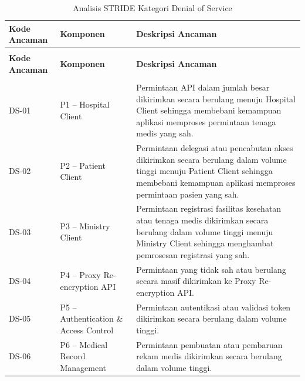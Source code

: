 \begin{xltabular}{\textwidth}{|>{\centering\arraybackslash}p{1.8cm}|>{\raggedright\arraybackslash}p{3.2cm}|X|}
    \caption{Analisis STRIDE Kategori Denial of Service}
    \label{tab:stride-denial-of-service} \\
    \hline
    \textbf{Kode Ancaman} &
    \textbf{Komponen} &
    \textbf{Deskripsi Ancaman} \\
    \hline
    \endfirsthead

    {} \\
    \hline
    \textbf{Kode Ancaman} &
    \textbf{Komponen} &
    \textbf{Deskripsi Ancaman} \\
    \hline
    \endhead

    \hline
     \\
    \endfoot

    \hline
    \endlastfoot

    DS-01 &
    P1 -- Hospital Client &
    Permintaan API dalam jumlah besar dikirimkan secara berulang menuju Hospital Client sehingga membebani kemampuan aplikasi memproses permintaan tenaga medis yang sah. \\
    \hline

    DS-02 &
    P2 -- Patient Client &
    Permintaan delegasi atau pencabutan akses dikirimkan secara berulang dalam volume tinggi menuju Patient Client sehingga membebani kemampuan aplikasi memproses permintaan pasien yang sah. \\
    \hline

    DS-03 &
    P3 -- Ministry Client &
    Permintaan registrasi fasilitas kesehatan atau tenaga medis dikirimkan secara berulang dalam volume tinggi menuju Ministry Client sehingga menghambat pemrosesan registrasi yang sah. \\
    \hline

    DS-04 &
    P4 -- Proxy Re-encryption API &
    Permintaan yang tidak sah atau berulang secara masif dikirimkan ke Proxy Re-encryption API. \\
    \hline

    DS-05 &
    P5 -- Authentication \& Access Control &
    Permintaan autentikasi atau validasi token dikirimkan secara berulang dalam volume tinggi. \\
    \hline

    DS-06 &
    P6 -- Medical Record Management &
    Permintaan pembuatan atau pembaruan rekam medis dikirimkan secara berulang dalam volume tinggi. \\
    \hline


\end{xltabular}
